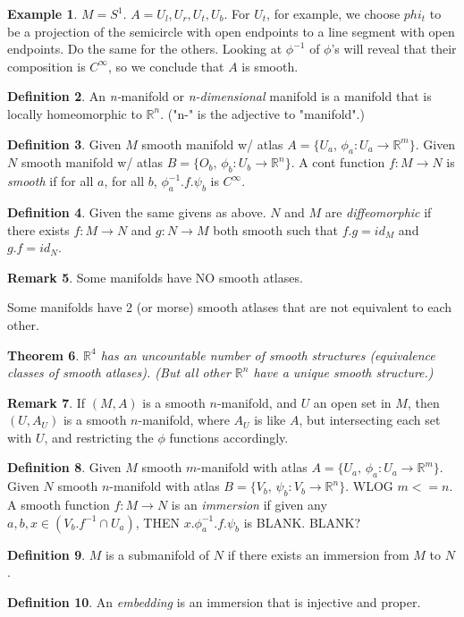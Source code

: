 \documentclass[11pt,leqno,oneside]{amsart}
\newcommand{\R}{{\mathbb R}} %
\newtheorem{thm}{Theorem}[section]
\theoremstyle{definition}
\newtheorem{defn}[thm]{Definition}
\newtheorem{example}[thm]{Example}
\newtheorem{rmk}[thm]{Remark}
\numberwithin{equation}{section}
\begin{document}
\begin{example}
	$M = S^1$.  $A = {U_l, U_r, U_t, U_b}$.  For $U_t$, for example, we choose $phi_t$ to be a projection of the semicircle with open endpoints to a line segment with open endpoints.  Do the same for the others.  Looking at $\phi^{-1}$ of $\phi$'s will reveal that their composition is $C^\infty$, so we conclude that $A$ is smooth.
\end{example}

\begin{defn}
	An \emph{n-}manifold or \emph{n-dimensional} manifold is a manifold that is locally homeomorphic to $\R^n$.  ("n-" is the adjective to "manifold".)
\end{defn}


\begin{defn}
	Given $M$ smooth manifold w/ atlas $A = \{ U_a, \,  \phi_a : U_a \to \R^m \}$.
	Given $N$ smooth manifold w/ atlas $B = \{ O_b, \,  \phi_b : U_b \to \R^n \}$.
	A cont function $f : M \to N$ is \emph{smooth} if for all $a$, for all $b$, $\phi_a^{-1}.f.\psi_b$ is $C^\infty$.
\end{defn}
\begin{defn}
	Given the same givens as above.
	$N$ and $M$ are \emph{diffeomorphic} if there exists $f : M \to N$ and $g : N \to M$ both smooth such that $f.g = id_M$ and $g.f = id_N$.
\end{defn}

\begin{rmk}
	Some manifolds have NO smooth atlases.

	Some manifolds have 2 (or morse) smooth atlases that are not equivalent to each other.
\end{rmk}


\begin{thm}
	$\R^4$ has an uncountable number of smooth structures (equivalence classes of smooth atlases).  (But all other $\R^n$ have a unique smooth structure.)
\end{thm}

\begin{rmk}
	If $(M,A)$ is a smooth $n$-manifold, and $U$ an open set in $M$, then $(U,A_U)$ is a smooth $n$-manifold, where $A_U$ is like $A$, but intersecting each set with $U$, and restricting the $\phi$ functions accordingly.
\end{rmk}

\begin{defn}
	Given $M$ smooth $m$-manifold with atlas $A = \{ U_a, \,\phi_a : U_a \to \R^m \}$.
	Given $N$ smooth $n$-manifold with atlas $B = \{ V_b, \,\psi_b : V_b \to \R^n \}$.
	WLOG $m <=n$.
	A smooth function $f : M \to N$  is an \emph{immersion} if given any $a, b, x \in (V_b.f^{-1} \cap U_a)$, THEN $x.\phi_a^{-1}.f.\psi_b$ is BLANK.  BLANK?
\end{defn}

\begin{defn}
	$M$ is a submanifold of $N$ if there exists an immersion from $M$ to $N$.
\end{defn}

\begin{defn}
	An \emph{embedding} is an immersion that is injective and proper.
\end{defn}
\end{document}
